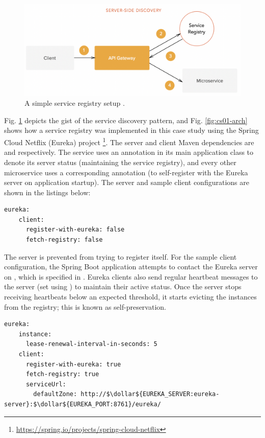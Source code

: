 \begin{figure}[H]
  \centering
  \includegraphics[width=0.7\linewidth]{./assets/images/case-study-01/server-side-discovery.png}
  \caption{A simple service registry setup \cite{peyrott15}.}
  \label{fig:server-side-discovery}
\end{figure}

Fig. \ref{fig:server-side-discovery} depicts the gist of the service discovery pattern, and Fig. \ref{fig:cs01-arch} shows how a service registry was implemented in this case study using the Spring Cloud Netflix (Eureka) project \footnote{\url{https://spring.io/projects/spring-cloud-netflix}}. The server and client Maven dependencies are  and  respectively. The  service uses an  annotation in its main application class to denote its server status (maintaining the service registry), and every other microservice uses a corresponding  annotation (to self-register with the Eureka server on application startup). The server and sample client configurations are shown in the listings below:

\begin{lstlisting}[caption=Snippet from Eureka server's application properties.]
  eureka:
    client:
      register-with-eureka: false
      fetch-registry: false
\end{lstlisting}

The server is prevented from trying to register itself. For the sample client configuration, the Spring Boot application attempts to contact the Eureka server on , which is specified in . Eureka clients also send regular heartbeat messages to the server (set using ) to maintain their active status. Once the server stops receiving heartbeats below an expected threshold, it starts evicting the instances from the registry; this is known as self-preservation.

\begin{lstlisting}[caption=Snippet from a Eureka client's application properties.]
  eureka:
    instance:
      lease-renewal-interval-in-seconds: 5
    client:
      register-with-eureka: true
      fetch-registry: true
      serviceUrl:
        defaultZone: http://$\dollar${EUREKA_SERVER:eureka-server}:$\dollar${EUREKA_PORT:8761}/eureka/
\end{lstlisting}

